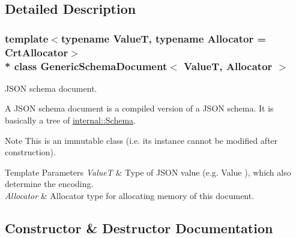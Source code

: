 \subsection{Detailed Description}
\subsubsection*{template$<$typename ValueT, typename Allocator = Crt\+Allocator$>$\\*
class Generic\+Schema\+Document$<$ Value\+T, Allocator $>$}

J\+S\+ON schema document. 

A J\+S\+ON schema document is a compiled version of a J\+S\+ON schema. It is basically a tree of \hyperlink{classinternal_1_1Schema}{internal\+::\+Schema}.

\begin{DoxyNote}{Note}
This is an immutable class (i.\+e. its instance cannot be modified after construction). 
\end{DoxyNote}

\begin{DoxyTemplParams}{Template Parameters}
{\em ValueT} & Type of J\+S\+ON value (e.\+g. {\ttfamily Value} ), which also determine the encoding. \\
\hline
{\em Allocator} & Allocator type for allocating memory of this document. \\
\hline
\end{DoxyTemplParams}


\subsection{Constructor \& Destructor Documentation}
